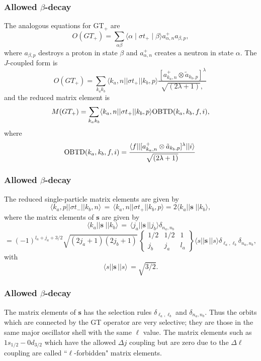 \documentclass[compress]{beamer}
\renewcommand{\vec}[1]{\mathbf{#1}}
\renewcommand{\vec}[1]{\boldsymbol{#1}}
\begin{document}
 \frame
 {
 \frametitle{Allowed $\beta$-decay}
 \begin{small}
 {\scriptsize
The analogous equations for
GT$_{ + }$ are
\[
O(GT_{+}) = \displaystyle\sum _{\alpha \beta } \langle \alpha \mid \sigma  t_{+}\mid \beta \rangle a^{+}_{\alpha 
,n} a_{\beta ,p}, 
\]
where $  a_{\beta ,p}  $ destroys a proton in state $\beta$ and $  a^{+}_{\alpha ,n}  $
creates a neutron in state $\alpha$. The $  J  $-coupled form is
\[
O(GT_{+}) = \displaystyle\sum _{k_{a} k_{b}} \langle k_{a},n||\sigma  t_{+}||k_{b},p\rangle
\frac{ [a^{+}_{k_{a},n}\otimes \tilde{a}_{k_{b},p}]^{\lambda }}{ \sqrt{ (2\lambda +1)},}\,       
\]
and the reduced matrix element is
\[
M(GT_{+}) = \displaystyle\sum _{k_{a} k_{b}} \langle k_{a},n||\sigma  t_{+}||k_{b},p\rangle {\rm 
OBTD}(k_{a},k_{b},f,i), 
\]
where
\[
{\rm OBTD}(k_{a},k_{b},f,i) =
\frac{ \langle f||[a^{+}_{k_{a},n}\otimes \tilde{a}_{k_{b},p}]^{\lambda }||i\rangle}{ \sqrt{ (2\lambda +1)}}\,   
\]
 }
 \end{small}
 }
 \frame
 {
 \frametitle{Allowed $\beta$-decay}
 \begin{small}
 {\scriptsize
The reduced single-particle
matrix elements are given by
\[
\langle k_{a},p||\sigma  t_{-}||k_{b},n\rangle\, =\, \langle k_{a},n||\sigma  t_{+}||k_{b},p\rangle
= 2\langle k_{a}||\vec{s}\; ||k_{b}\rangle, 
\]
where the matrix elements of $\vec{s}$ are given by
\[
\langle k_{a}||\vec{s}\;||k_{b}\rangle\, =\, \langle j_{a}||\vec{s}\,||j_{b}\rangle \delta _{n_{a},n_{b}}
\]
\[
=
(-1)^{l_{a}+j_{a}+3/2}
\sqrt{(2j_{a}+1)(2j_{b}+1)}\,
   \left\{\begin{array}{ccc}  {1/2}&  {1/2}&  {1} \\ {j_{b}}&  {j_{a}}&  {l_{a}}\end{array}\right\}
\langle s||\vec{s}\,||s\rangle \delta _{\ell _{a},\ell _{b}} \delta _{n_{a},n_{b}}
,
\]
with
\[
\langle s||\vec{s}\,||s\rangle\, = \sqrt{3/2}.
\]
 }
 \end{small}
 }
 \frame
 {
 \frametitle{Allowed $\beta$-decay}
 \begin{small}
 {\scriptsize
The matrix elements of $\vec{s}$ has the selection rules $\delta_{ \ell_{a} , \ell_{b} }$
and $\delta_{n _{a} ,n _{b} }$. Thus the orbits which are connected by the GT operator
are very selective; they are those in the same major oscillator shell
with the same $\ell$ value. The matrix elements such as
$  1s_{1/2}-0d_{3/2}  $ which have the allowed $  \Delta j  $ coupling but
are zero due to the $\Delta\ell$ coupling are called ``$\ell$-forbidden" matrix
elements.
 }
 \end{small}
 }
\end{document}

